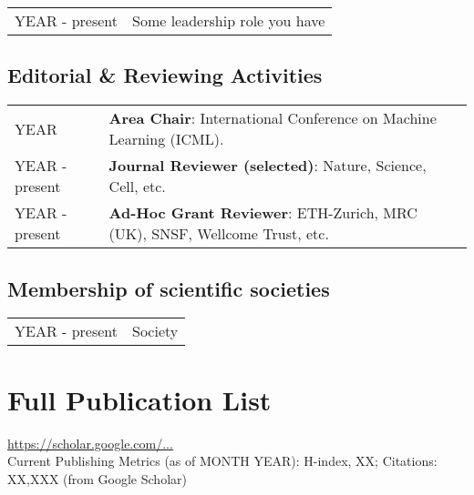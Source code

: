 \begin{tabular}[l]{ p{} p{} }

YEAR - present & Some leadership role you have \\

\end{tabular} 

\subsection{Editorial \& Reviewing Activities}

\begin{tabular}[l]{ p{} p{} }

YEAR & \textbf{Area Chair}: International Conference on Machine Learning (ICML).  \\
YEAR - present & \textbf{Journal Reviewer (selected)}: Nature, Science, Cell, etc.\\
YEAR - present & \textbf{Ad-Hoc Grant Reviewer}: ETH-Zurich, MRC (UK), SNSF, Wellcome Trust, etc. \\
\end{tabular} 

\subsection{Membership of scientific societies}

\begin{tabular}[l]{ p{} p{} }
YEAR - present  & Society\\
\end{tabular} 

\section{Full Publication List}	
\url{https://scholar.google.com/...}\\

\noindent Current Publishing Metrics (as of MONTH YEAR):
H-index, XX; Citations: XX,XXX	 (from Google Scholar)\\

